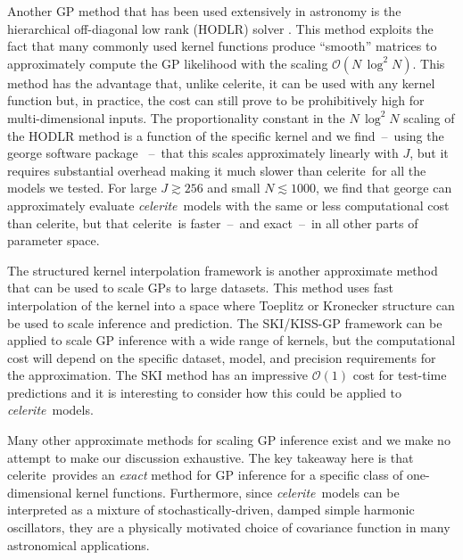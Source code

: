 \documentclass[manuscript, letterpaper]{aastex6}
\makeatletter
\let\origsection\section
\renewcommand\section{\@ifstar{\starsection}{\nostarsection}}
\newcommand\nostarsection[1]{\sectionprelude\origsection{#1}}
\newcommand\starsection[1]{\sectionprelude\origsection*{#1}}
\newcommand\sectionprelude{\vspace{1em}}
\newcommand{\project}[1]{\textsf{#1}}
\newcommand{\celerite}{\project{celerite}}
\newcommand{\celeriteterm}{\emph{celerite}}
\makeatother
\begin{document}
Another GP method that has been used extensively in astronomy is the
hierarchical off-diagonal low rank (HODLR) solver \citep{Ambikasaran:2016}.
This method exploits the fact that many commonly used kernel functions produce
``smooth'' matrices to approximately compute the GP likelihood with the
scaling $\mathcal{O}(N\,\log^2 N)$.
This method has the advantage that, unlike \celerite, it can be used with any
kernel function but, in practice, the cost can still prove to be prohibitively
high for multi-dimensional inputs.
The proportionality constant in the $N\,\log^2N$ scaling of the HODLR method
is a function of the specific kernel and we find~--~using the \project{george}
software package \citep{Foreman-Mackey:2014, Ambikasaran:2016}~--~that this
scales approximately linearly with $J$, but it requires substantial overhead
making it much slower than \celerite\ for all the models we tested.
For large $J \gtrsim 256$ and small $N \lesssim 1000$, we find that
\project{george} can approximately evaluate \celeriteterm\ models with the
same or less computational cost than \celerite, but that \celerite\ is
faster~--~and exact~--~in all other parts of parameter space.

The structured kernel interpolation \citep[SKI/KISS-GP][]{Wilson:2015}
framework is another approximate method that can be used to scale GPs to large
datasets.
This method uses fast interpolation of the kernel into a space where Toeplitz
or Kronecker structure can be used to scale inference and prediction.
The SKI/KISS-GP framework can be applied to scale GP inference with a wide
range of kernels, but the computational cost will depend on the specific
dataset, model, and precision requirements for the approximation.
The SKI method has an impressive $\mathcal{O}(1)$ cost for test-time
predictions and it is interesting to consider how this could be applied to
\celeriteterm\ models.

Many other approximate methods for scaling GP inference exist \citep[see, for
    example,][and references therein]{Wilson:2015a} and we make no attempt to make
our discussion exhaustive.
The key takeaway here is that \celerite\ provides an \emph{exact} method for
GP inference for a specific class of one-dimensional kernel functions.
Furthermore, since \celeriteterm\ models can be interpreted as a mixture of
stochastically-driven, damped simple harmonic oscillators, they are a
physically motivated choice of covariance function in many astronomical applications.

\section{Discussion}
\end{document}
